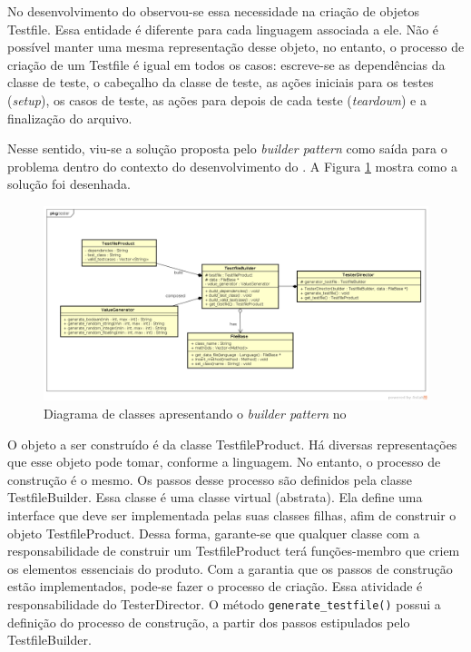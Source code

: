 No desenvolvimento do \framework observou-se essa necessidade na
criação de objetos \textsf{Testfile}. Essa entidade é diferente para
cada linguagem associada a ele. Não é possível manter uma mesma
representação desse objeto, no entanto, o processo de criação de um
\textsf{Testfile} é igual em todos os casos: escreve-se as
dependências da classe de teste, o cabeçalho da classe de teste,
as ações iniciais para os testes (\textit{setup}),
os casos de teste, as ações para depois de cada teste
(\textit{teardown}) e a finalização do arquivo.

Nesse sentido, viu-se a solução proposta pelo \textit{builder pattern}
como saída para o problema dentro do contexto do desenvolvimento do
\Scarefault. A Figura \ref{testfile-diagram} mostra como a solução
foi desenhada.
\begin{figure}[h]
  \centering
    \includegraphics[width=\textwidth]{figuras/testfile-diagram.png}
    \caption{Diagrama de classes apresentando o \textit{builder pattern} no \framework}
    \label{testfile-diagram}
\end{figure}
\FloatBarrier

O objeto a ser construído é da classe \textsf{TestfileProduct}. Há
diversas representações que esse objeto pode tomar, conforme a linguagem.
No entanto, o processo de construção é o mesmo. Os passos desse processo são definidos
pela classe \textsf{TestfileBuilder}. Essa classe é uma classe
\textsf{virtual} (abstrata). Ela define uma interface que deve ser
implementada pelas suas classes filhas, afim de construir o objeto
\textsf{TestfileProduct}. Dessa forma, garante-se que qualquer
classe com a responsabilidade de construir um \textsf{TestfileProduct}
terá funções-membro que criem os elementos essenciais do produto. Com a garantia
que os passos de construção estão implementados, pode-se fazer o processo de
criação. Essa atividade é responsabilidade do \textsf{TesterDirector}. O
método \lstinline|generate_testfile()| possui a definição do processo de
construção, a partir dos passos estipulados pelo \textsf{TestfileBuilder}.

